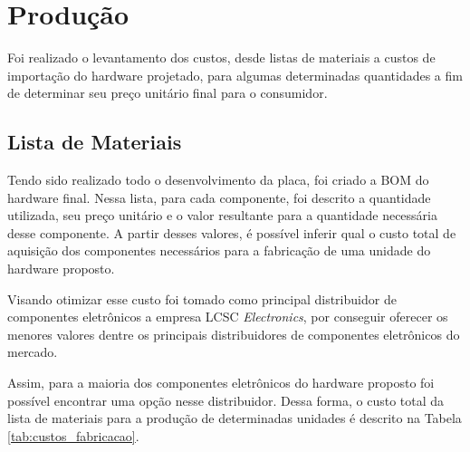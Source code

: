 \section{Produção}

Foi realizado o levantamento dos custos, desde listas de materiais a custos de importação do hardware projetado, para algumas determinadas quantidades a fim de determinar seu preço unitário final para o consumidor.

\subsection{Lista de Materiais}

Tendo sido realizado todo o desenvolvimento da placa, foi criado a \gls{BOM} do hardware final. Nessa lista, para cada componente, foi descrito a quantidade utilizada, seu preço unitário e o valor resultante para a quantidade necessária desse componente. A partir desses valores, é possível inferir qual o custo total de aquisição dos componentes necessários para a fabricação de uma unidade do hardware proposto. 

Visando otimizar esse custo foi tomado como principal distribuidor de componentes eletrônicos a empresa LCSC \textit{Electronics}, por conseguir oferecer os menores valores dentre os principais distribuidores de componentes eletrônicos do mercado.

Assim, para a maioria dos componentes eletrônicos do hardware proposto foi possível encontrar uma opção nesse distribuidor. Dessa forma, o custo total da lista de materiais para a produção de determinadas unidades é descrito na Tabela \ref{tab:custos_fabricacao}.

	\begin{table}[!h]
	\captionsetup{width=9cm}%
    \end{table}





